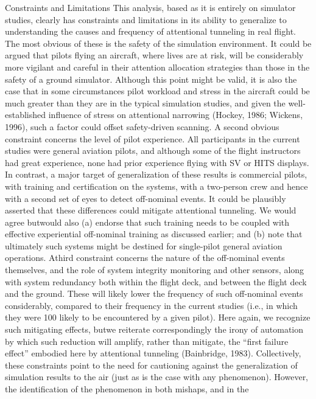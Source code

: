 \documentclass[utf8,bachelor,manualbib]{gradu3}
\begin{document}
Constraints and Limitations
This analysis, based as it is entirely on simulator studies, clearly has constraints
and limitations in its ability to generalize to understanding the causes and frequency
of attentional tunneling in real flight. The most obvious of these is the safety of the simulation environment. It could be argued that pilots flying an aircraft,
where lives are at risk, will be considerably more vigilant and careful in their
attention allocation strategies than those in the safety of a ground simulator. Although
this point might be valid, it is also the case that in some circumstances pilot
workload and stress in the aircraft could be much greater than they are in the typical
simulation studies, and given the well-established influence of stress on
attentional narrowing (Hockey, 1986; Wickens, 1996), such a factor could offset
safety-driven scanning.
A second obvious constraint concerns the level of pilot experience. All participants
in the current studies were general aviation pilots, and although some of the
flight instructors had great experience, none had prior experience flying with SV or
HITS displays. In contrast, a major target of generalization of these results is commercial
pilots, with training and certification on the systems, with a two-person crew
and hence with a second set of eyes to detect off-nominal events. It could be plausibly
asserted that these differences could mitigate attentional tunneling. We would
agree butwould also (a) endorse that such training needs to be coupled with effective
experiential off-nominal training as discussed earlier; and (b) note that ultimately
such systems might be destined for single-pilot general aviation operations.
Athird constraint concerns the nature of the off-nominal events themselves, and
the role of system integrity monitoring and other sensors, along with system redundancy
both within the flight deck, and between the flight deck and the ground.
These will likely lower the frequency of such off-nominal events considerably,
compared to their frequency in the current studies (i.e., in which they were 100%
likely to be encountered by a given pilot). Here again, we recognize such mitigating
effects, butwe reiterate correspondingly the irony of automation by which such
reduction will amplify, rather than mitigate, the “first failure effect” embodied here
by attentional tunneling (Bainbridge, 1983).
Collectively, these constraints point to the need for cautioning against the generalization
of simulation results to the air (just as is the case with any phenomenon).
However, the identification of the phenomenon in both mishaps, and in the
\end{document}
